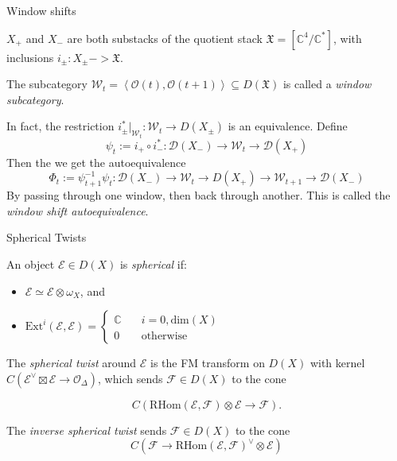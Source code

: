 \documentclass{beamer}
\begin{document}
\begin{frame}{Window shifts}

$X_+$ and $X_-$ are both substacks of the quotient stack $\mathfrak{X} = [\mathbb{C}^4 / \mathbb{C}^*]$, with inclusions $i_{\pm} : X_\pm -> \mathfrak{X}$. 

\vspace{0.3cm}

The subcategory $\mathcal{W}_t = \left<\mathcal{O}(t),\mathcal{O}(t+1) \right> \subseteq D(\mathfrak{X})$ is called a \emph{window subcategory}.

In fact, the restriction $i^*_\pm \big|_{\mathcal{W}_t}: \mathcal{W}_t \to D(X_\pm )$ is an equivalence. Define 
$$\psi_{t}:= i_{+}\circ i_{-}^{*}: \mathcal{D}(X_{-})\to \mathcal{W}_t \to \mathcal{D}(X_{+})$$
Then the we get the autoequivalence 
$$\Phi_{t}:= \psi_{t+1}^{-1}\psi_{t}: \mathcal{D}(X_{-})\to \mathcal{W}_t \to D(X_+ ) \to \mathcal{W}_{t+1} \to \mathcal{D}(X_{-})$$
By passing through one window, then back through another. This is called the \emph{window shift autoequivalence}.
\end{frame}

\begin{frame}{Spherical Twists}
    \begin{definition}
        An object $\mathcal{E} \in D(X)$ is \emph{spherical} if: 
        \begin{itemize}
            \item $\mathcal{E} \simeq \mathcal{E} \otimes \omega_X $, and
            \item $\mathrm{Ext}^i (\mathcal{E}, \mathcal{E}) = \begin{cases}
                \mathbb{C}& \quad i=0, \mathrm{dim}(X) \\
                0&\quad \text{otherwise}
            \end{cases}$
        \end{itemize} 
    \end{definition}


    \begin{definition}
        The \emph{spherical twist} around $\mathcal{E}$ is the FM transform on $D(X)$  with kernel $C\left(\mathcal{E}^\vee \boxtimes \mathcal{E} \to \mathcal{O}_\Delta \right)$, which sends $\mathcal{F}\in D(X)$ to the cone 
        
        $$C\left(\mathrm{RHom}(\mathcal{E},\mathcal{F}) \otimes \mathcal{E}\to \mathcal{F} \right ).$$

        The \emph{inverse spherical twist} sends $\mathcal{F}\in D(X)$ to the cone 
        $$C \left(\mathcal{F}\to \mathrm{RHom}(\mathcal{E},\mathcal{F})^\vee \otimes \mathcal{E}  \right)$$
    \end{definition}
\end{frame}
\end{document}

